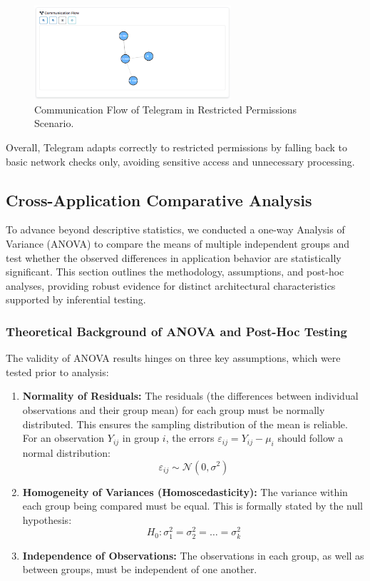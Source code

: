 \documentclass[a4paper,12pt]{report}
\begin{document}
\begin{figure}[H]
    \centering
    \includegraphics[width=0.65\textwidth]{telegram-none-flow.png}
    \caption{Communication Flow of Telegram in Restricted Permissions Scenario.}
    \label{fig:telegram-none-flow}
\end{figure}

Overall, Telegram adapts correctly to restricted permissions by falling back to basic network checks only, avoiding sensitive access and unnecessary processing.

\subsection{Cross-Application Comparative Analysis}

To advance beyond descriptive statistics, we conducted a one-way Analysis of Variance (ANOVA) to compare the means of multiple independent groups and test whether the observed differences in application behavior are statistically significant. This section outlines the methodology, assumptions, and post-hoc analyses, providing robust evidence for distinct architectural characteristics supported by inferential testing.

\subsubsection{Theoretical Background of ANOVA and Post-Hoc Testing}
The validity of ANOVA results hinges on three key assumptions, which were tested prior to analysis:
\begin{enumerate}[label=\roman*.]
    \item \textbf{Normality of Residuals:} The residuals (the differences between individual observations and their group mean) for each group must be normally distributed. This ensures the sampling distribution of the mean is reliable. For an observation \( Y_{ij} \) in group \(i\), the errors \( \varepsilon_{ij} = Y_{ij} - \mu_i \) should follow a normal distribution:
    $$ \varepsilon_{ij} \sim \mathcal{N}(0, \sigma^2) $$
    \item \textbf{Homogeneity of Variances (Homoscedasticity):} The variance within each group being compared must be equal. This is formally stated by the null hypothesis:
    $$ H_0: \sigma^2_1 = \sigma^2_2 = \dots = \sigma^2_k $$
    \item \textbf{Independence of Observations:} The observations in each group, as well as between groups, must be independent of one another.
\end{enumerate}
\end{document}
